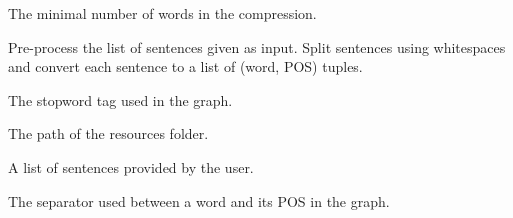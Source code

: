 \documentclass[letterpaper,10pt,english]{sphinxmanual}
\begin{document}
\begin{fulllineitems}

\begin{fulllineitems}
\label{index:takahe.word_graph.nb_words}
The minimal number of words in the compression.

\end{fulllineitems}


\begin{fulllineitems}
\label{index:takahe.word_graph.pre_process_sentences}
Pre-process the list of sentences given as input. Split sentences using 
whitespaces and convert each sentence to a list of (word, POS) tuples.

\end{fulllineitems}


\begin{fulllineitems}
\label{index:takahe.word_graph.punct_tag}
The stopword tag used in the graph.

\end{fulllineitems}


\begin{fulllineitems}
\label{index:takahe.word_graph.resources}
The path of the resources folder.

\end{fulllineitems}


\begin{fulllineitems}
\label{index:takahe.word_graph.sentence}
A list of sentences provided by the user.

\end{fulllineitems}


\begin{fulllineitems}
\label{index:takahe.word_graph.sep}
The separator used between a word and its POS in the graph.


\end{fulllineitems}
\end{fulllineitems}
\end{document}
